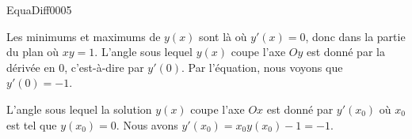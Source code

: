 \begin{corrige}{EquaDiff0005}

Les minimums et maximums de $y(x)$ sont là où $y'(x)=0$, donc dans la partie du plan où $xy=1$. L'angle sous lequel $y(x)$ coupe l'axe $Oy$ est donné par la dérivée en $0$, c'est-à-dire par $y'(0)$. Par l'équation, nous voyons que $y'(0)=-1$.

L'angle sous lequel la solution $y(x)$ coupe l'axe $Ox$ est donné par $y'(x_0)$ où $x_0$ est tel que $y(x_0)=0$. Nous avons $y'(x_0)=x_0y(x_0)-1=-1$.

\end{corrige}
